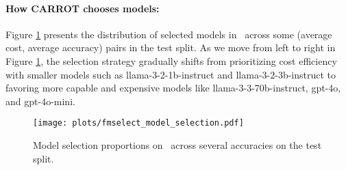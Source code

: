 \paragraph{How CARROT chooses models:} %
Figure \ref{fig:model selection} presents the distribution of selected models in \newdata\ across some (average cost, average accuracy) pairs in the test split. As we move from left to right in Figure \ref{fig:model selection}, the selection strategy gradually shifts from prioritizing cost efficiency with smaller models such as {llama-3-2-1b-instruct} and {llama-3-2-3b-instruct} to favoring more capable and expensive models like {llama-3-3-70b-instruct}, {gpt-4o}, and {gpt-4o-mini}.

\begin{figure}
    \centering
    \texttt{[image: plots/fmselect\_model\_selection.pdf]}
    \vspace{-0.3cm}
    \caption{Model selection proportions on \newdata\ across several accuracies on the test split.}
    \label{fig:model selection}
\end{figure}




